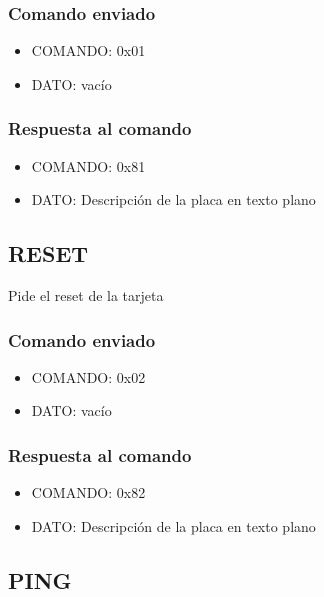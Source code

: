 \documentclass[a4paper,10pt]{article}
\begin{document}
\subsubsection*{Comando enviado}
\label{init_comando_enviado}

\begin{itemize}
	\item{COMANDO:} 0x01
	\item{DATO:} vac\'io
\end{itemize}

\subsubsection*{Respuesta al comando}
\label{init_respuesta}

\begin{itemize}
	\item{COMANDO:} 0x81
	\item{DATO:} Descripci\'on de la placa en texto plano
\end{itemize}

\subsection{RESET}
\label{reset}

Pide el reset de la tarjeta

\subsubsection*{Comando enviado}
\label{reset_comando_enviado}

\begin{itemize}
	\item{COMANDO:} 0x02
	\item{DATO:} vac\'io
\end{itemize}

\subsubsection*{Respuesta al comando}
\label{reset_respuesta}

\begin{itemize}
	\item{COMANDO:} 0x82
	\item{DATO:} Descripci\'on de la placa en texto plano
\end{itemize}

\subsection{PING}
\label{ping}
\end{document}
